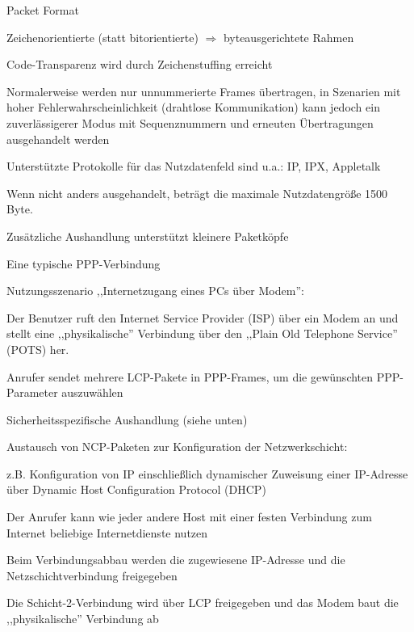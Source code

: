 \documentclass[a4paper]{article}
\begin{document}
\begin{multicols}{3}
      Packet Format
      \begin{itemize*}
            \item Zeichenorientierte (statt bitorientierte) $\Rightarrow$ byteausgerichtete Rahmen
            \item Code-Transparenz wird durch Zeichenstuffing erreicht
            \item Normalerweise werden nur unnummerierte Frames übertragen, in Szenarien mit hoher Fehlerwahrscheinlichkeit (drahtlose Kommunikation) kann jedoch ein zuverlässigerer Modus mit Sequenznummern und erneuten Übertragungen ausgehandelt werden
            \item Unterstützte Protokolle für das Nutzdatenfeld sind u.a.: IP, IPX, Appletalk
            \item Wenn nicht anders ausgehandelt, beträgt die maximale Nutzdatengröße 1500 Byte.
            \item Zusätzliche Aushandlung unterstützt kleinere Paketköpfe
      \end{itemize*}

      Eine typische PPP-Verbindung
      \begin{itemize*}
            \item Nutzungsszenario ,,Internetzugang eines PCs über Modem'':
            \begin{itemize*}
                  \item Der Benutzer ruft den Internet Service Provider (ISP) über ein Modem an und stellt eine ,,physikalische'' Verbindung über den ,,Plain Old Telephone Service'' (POTS) her.
                  \item Anrufer sendet mehrere LCP-Pakete in PPP-Frames, um die gewünschten PPP-Parameter auszuwählen
                  \item Sicherheitsspezifische Aushandlung (siehe unten)
                  \item Austausch von NCP-Paketen zur Konfiguration der Netzwerkschicht:
                  \begin{itemize*}
                        \item z.B. Konfiguration von IP einschließlich dynamischer Zuweisung einer IP-Adresse über Dynamic Host Configuration Protocol (DHCP)
                  \end{itemize*}
                  \item Der Anrufer kann wie jeder andere Host mit einer festen Verbindung zum Internet beliebige Internetdienste nutzen
                  \item Beim Verbindungsabbau werden die zugewiesene IP-Adresse und die Netzschichtverbindung freigegeben
                  \item Die Schicht-2-Verbindung wird über LCP freigegeben und das Modem baut die ,,physikalische'' Verbindung ab
            \end{itemize*}
      \end{itemize*}


\end{multicols}
\end{document}
